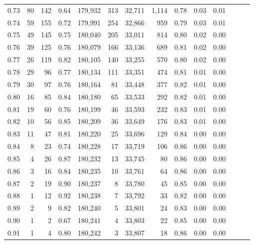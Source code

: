 \begin{tabular}{rrrrrrrrrrrrrr}
0.73 &     80 &  142 &  0.64 &  179,932 &      313 &  32,711 &   1,114 &  0.78 &  0.03 &      0.01 \\
0.74 &     59 &  155 &  0.72 &  179,991 &      254 &  32,866 &     959 &  0.79 &  0.03 &      0.01 \\
0.75 &     49 &  145 &  0.75 &  180,040 &      205 &  33,011 &     814 &  0.80 &  0.02 &      0.00 \\
0.76 &     39 &  125 &  0.76 &  180,079 &      166 &  33,136 &     689 &  0.81 &  0.02 &      0.00 \\
0.77 &     26 &  119 &  0.82 &  180,105 &      140 &  33,255 &     570 &  0.80 &  0.02 &      0.00 \\
0.78 &     29 &   96 &  0.77 &  180,134 &      111 &  33,351 &     474 &  0.81 &  0.01 &      0.00 \\
0.79 &     30 &   97 &  0.76 &  180,164 &       81 &  33,448 &     377 &  0.82 &  0.01 &      0.00 \\
0.80 &     16 &   85 &  0.84 &  180,180 &       65 &  33,533 &     292 &  0.82 &  0.01 &      0.00 \\
0.81 &     19 &   60 &  0.76 &  180,199 &       46 &  33,593 &     232 &  0.83 &  0.01 &      0.00 \\
0.82 &     10 &   56 &  0.85 &  180,209 &       36 &  33,649 &     176 &  0.83 &  0.01 &      0.00 \\
0.83 &     11 &   47 &  0.81 &  180,220 &       25 &  33,696 &     129 &  0.84 &  0.00 &      0.00 \\
0.84 &      8 &   23 &  0.74 &  180,228 &       17 &  33,719 &     106 &  0.86 &  0.00 &      0.00 \\
0.85 &      4 &   26 &  0.87 &  180,232 &       13 &  33,745 &      80 &  0.86 &  0.00 &      0.00 \\
0.86 &      3 &   16 &  0.84 &  180,235 &       10 &  33,761 &      64 &  0.86 &  0.00 &      0.00 \\
0.87 &      2 &   19 &  0.90 &  180,237 &        8 &  33,780 &      45 &  0.85 &  0.00 &      0.00 \\
0.88 &      1 &   12 &  0.92 &  180,238 &        7 &  33,792 &      33 &  0.82 &  0.00 &      0.00 \\
0.89 &      2 &    9 &  0.82 &  180,240 &        5 &  33,801 &      24 &  0.83 &  0.00 &      0.00 \\
0.90 &      1 &    2 &  0.67 &  180,241 &        4 &  33,803 &      22 &  0.85 &  0.00 &      0.00 \\
0.91 &      1 &    4 &  0.80 &  180,242 &        3 &  33,807 &      18 &  0.86 &  0.00 &      0.00 \\

\end{tabular}
